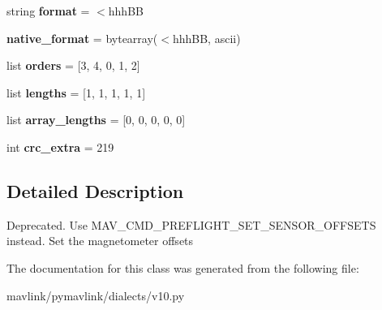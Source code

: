 \begin{DoxyCompactItemize}
string {\bfseries format} = \textquotesingle{}$<$hhh\+BB\textquotesingle{}
\item 
\mbox{\label{classpymavlink_1_1dialects_1_1v10_1_1MAVLink__set__mag__offsets__message_af7f8ae40f0160900d73c391afabf1ff7}} 
{\bfseries native\+\_\+format} = bytearray(\textquotesingle{}$<$hhh\+BB\textquotesingle{}, \textquotesingle{}ascii\textquotesingle{})
\item 
\mbox{\label{classpymavlink_1_1dialects_1_1v10_1_1MAVLink__set__mag__offsets__message_a227a8e57b3d11ad5e8b015f600268d1d}} 
list {\bfseries orders} = \mbox{[}3, 4, 0, 1, 2\mbox{]}
\item 
\mbox{\label{classpymavlink_1_1dialects_1_1v10_1_1MAVLink__set__mag__offsets__message_a49b589870c5c0bfadbce8ed7408ad2fb}} 
list {\bfseries lengths} = \mbox{[}1, 1, 1, 1, 1\mbox{]}
\item 
\mbox{\label{classpymavlink_1_1dialects_1_1v10_1_1MAVLink__set__mag__offsets__message_a1b729cacd23e4f702c53d95b694b5458}} 
list {\bfseries array\+\_\+lengths} = \mbox{[}0, 0, 0, 0, 0\mbox{]}
\item 
\mbox{\label{classpymavlink_1_1dialects_1_1v10_1_1MAVLink__set__mag__offsets__message_ae4bb7c4d420c2e21c4ce96d076ee9556}} 
int {\bfseries crc\+\_\+extra} = 219
\end{DoxyCompactItemize}


\subsection{Detailed Description}
\begin{DoxyVerb}Deprecated. Use MAV_CMD_PREFLIGHT_SET_SENSOR_OFFSETS instead.
Set the magnetometer offsets
\end{DoxyVerb}
 

The documentation for this class was generated from the following file\+:\begin{DoxyCompactItemize}
\item 
mavlink/pymavlink/dialects/v10.\+py\end{DoxyCompactItemize}
